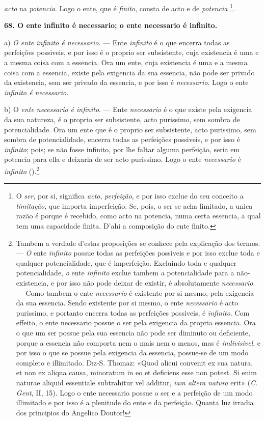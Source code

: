  \emph{acto} na \emph{potencia}. Logo o ente, que é \emph{finito}, consta de acto e de \emph{potencia} \footnote{O \emph{ser}, por si, significa \emph{acto}, \emph{perfeição}, e por isso exclue do seu conceito a \emph{limitação}, que importa imperfeição. Se, pois, o ser se acha limitado, a unica razão é porque é recebido, como acto na potencia, numa certa essencia, a qual tem uma capacidade finita. D'ahi a composição do ente finito.}.

\textbf{68. O ente infinito é necessario; o ente necessario é infinito.}

a) \emph{O ente infinito é necessario}. --- Ente \emph{infinito} é o que encerra todas as perfeições possiveis, e por isso é o proprio ser subsistente, cuja existencia é uma e a mesma coisa com a essencia. Ora um ente, cuja existencia é uma e a mesma coisa com a essencia, existe pela exigencia da sua essencia, não pode ser privado da existencia, sem ser privado da essencia, e por isso é \emph{necessario}. Logo o ente \emph{infinito é necessario}.

b) O \emph{ente necessario é infinito}. --- Ente \emph{necessario} é o que existe pela exigencia da sua natureza, é o proprio ser subsistente, acto purissimo, sem sombra de potencialidade. Ora um ente que é o proprio ser subsistente, acto purissimo, sem sombra de potencialidade, encerra todas as perfeições possiveis, e por isso é \emph{infinito}; pois; se não fosse infinito, por lhe faltar alguma perfeição, seria em potencia para ella e deixaria de ser acto purissimo. Logo o ente \emph{necessario} é \emph{infinito} ().\footnote{Tambem a verdade d'estas proposições se conhece pela explicação dos termos. --- \emph{O} ente \emph{infinito} possue todas as perfeições possiveis e por isso exclue toda e qualquer potencialidade, que é imperfeição. Excluindo toda e qualquer potencialidade, \emph{o} ente \emph{infinito} exclue tambem a potencialidade para a não-existencia, e por isso não pode deixar de existir, é absolutamente \emph{necessario}. --- Como tambem o ente \emph{necessario} é existente por si mesmo, pela exigencia da sua essencia. Sendo existente por si mesmo, o ente \emph{necessario} é acto purissimo, e portanto encerra todas as perfeições possiveis, é \emph{infinito}. Com effeito, o ente necessario possue o ser pela exigencia da propria essencia. Ora o que um ser possue pela sua essencia não pode ser diminuto ou deficiente, porque a essencia não comporta nem o mais nem o menos, mas é \emph{indivisivel}, e por isso o que se possue pela exigencia da essencia, possue-se de um modo completo e illimitado. \textsc{Diz-S}. Thomaz: «Quod alicui convenit ex sua natura, et non ex aliqua causa, minoratum in eo et deficiens esse non potest. Si enim naturae aliquid essentiale subtrahitur vel additur, \emph{iam altera natura} erit» (\emph{C}. \emph{Gent}, II, 15). Logo o ente necessario possue o ser e a perfeição de um modo illimitado e por isso é a plenitude do ente e da perfeição. Quanta luz irradia dos principios do Angelico Doutor!}
